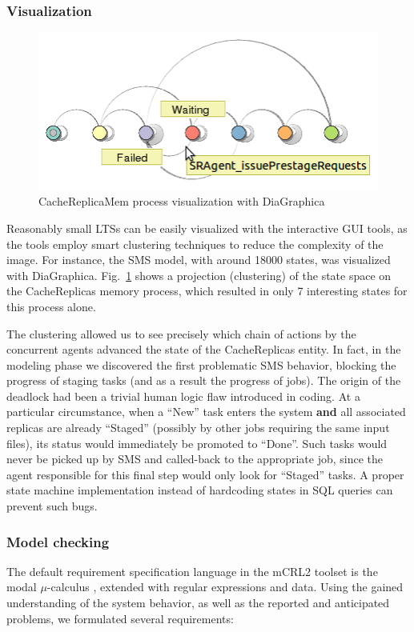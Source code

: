 \documentclass[10pt,conference]{IEEEtran}
\begin{document}
\subsubsection{Visualization}
\begin{figure}[bp]
\vspace{-20 pt}
\includegraphics[width=0.9\linewidth,keepaspectratio=true]{./DiaGraphica.png}
\centering
\caption{CacheReplicaMem process visualization with DiaGraphica}
\label{fig:DiaGraphica}
\end{figure}%
Reasonably small LTSs can be easily visualized with the interactive GUI tools,
as the tools employ smart clustering techniques to reduce the complexity of the image.
For instance, the SMS model, with around 18000 states,
was visualized with DiaGraphica. Fig.~\ref{fig:DiaGraphica} shows a projection (clustering) of the state space
on the CacheReplicas memory process, which resulted in only 7 interesting states for this process alone.

The clustering
allowed us to see precisely which chain of actions by the concurrent agents
advanced the state of the CacheReplicas entity. In fact, in the modeling phase we discovered the first problematic
SMS behavior, blocking the progress of staging
tasks (and as a result the progress of jobs). The origin of the deadlock had been a
trivial human logic flaw introduced in coding. At a particular circumstance,
when a ``New'' task enters the system \textbf{and} all associated replicas
are already ``Staged'' (possibly by other jobs requiring the same input files),
its status would immediately be promoted to ``Done''.
Such tasks would never be picked up by SMS and called-back to the appropriate job, 
since the agent responsible for this final step would only look for ``Staged'' tasks.
A proper state machine implementation
instead of hardcoding states in SQL queries can prevent such bugs.
\subsubsection{Model checking}
The default requirement specification language in the mCRL2 toolset
is the modal $\mu$-calculus \cite{ProcessesWithData}, extended with regular expressions and data.
Using the gained understanding of the system behavior, as well as the 
reported and anticipated problems, we formulated several requirements:
\end{document}
